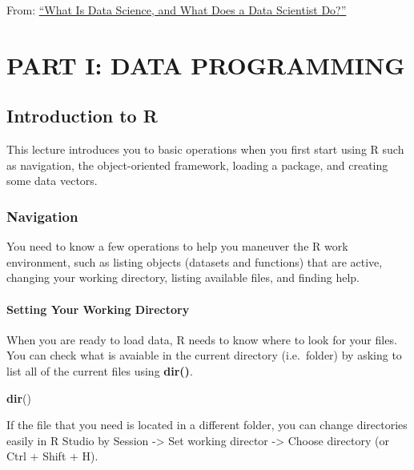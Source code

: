 \documentclass[]{book}
\newenvironment{Shaded}{\begin{snugshade}}{\end{snugshade}}
\newcommand{\KeywordTok}[1]{\textcolor[rgb]{0.13,0.29,0.53}{\textbf{#1}}}
\newcommand{\NormalTok}[1]{#1}
\theoremstyle{definition}
\theoremstyle{definition}
\theoremstyle{definition}
\theoremstyle{remark}
\begin{document}
From:
\href{https://www.innoarchitech.com/what-is-data-science-does-data-scientist-do/}{``What
Is Data Science, and What Does a Data Scientist Do?''}

\hypertarget{part-part-i-data-programming}{%
\part{PART I: DATA
PROGRAMMING}\label{part-part-i-data-programming}}

\hypertarget{introduction-to-r}{%
\chapter{Introduction to R}\label{introduction-to-r}}

This lecture introduces you to basic operations when you first start
using R such as navigation, the object-oriented framework, loading a
package, and creating some data vectors.

\hypertarget{navigation}{%
\section{Navigation}\label{navigation}}

You need to know a few operations to help you maneuver the R work
environment, such as listing objects (datasets and functions) that are
active, changing your working directory, listing available files, and
finding help.

\hypertarget{setting-your-working-directory}{%
\subsection{Setting Your Working
Directory}\label{setting-your-working-directory}}

When you are ready to load data, R needs to know where to look for your
files. You can check what is avaiable in the current directory
(i.e.~folder) by asking to list all of the current files using
\textbf{dir()}.

\begin{Shaded}
\begin{Highlighting}[]
\KeywordTok{dir}\NormalTok{()}
\end{Highlighting}
\end{Shaded}

If the file that you need is located in a different folder, you can
change directories easily in R Studio by Session -\textgreater{} Set
working director -\textgreater{} Choose directory (or Ctrl + Shift + H).
\end{document}
